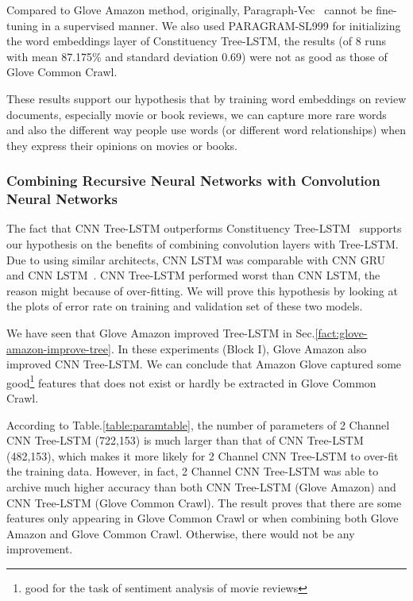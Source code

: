 Compared to Glove Amazon method, originally,  Paragraph-Vec~\cite{ParagraphVec} cannot be fine-tuning in a supervised manner.
We also used PARAGRAM-SL999 for initializing the word embeddings layer of Constituency Tree-LSTM,
the results (of 8 runs with mean 87.175\% and standard deviation 0.69) were not as good as those of Glove Common Crawl.

These results support our hypothesis that by training word embeddings on review documents, especially movie or book reviews, we can capture more rare words and also the different way people use words (or different word relationships) when they express their opinions on movies or books.

\subsubsection{Combining Recursive Neural Networks with Convolution Neural Networks}
\label{proved:tree-conv-benefit}
The fact that CNN Tree-LSTM outperforms Constituency Tree-LSTM~\cite{treeLSTM} supports our hypothesis on the benefits of combining convolution layers with Tree-LSTM.
Due to using similar architects, CNN LSTM was comparable with CNN GRU and CNN LSTM~\cite{cnn-rnn}. \label{unproved:cnn-treelstm-overfit}
CNN Tree-LSTM performed worst than CNN LSTM, the reason might because of over-fitting.
We will prove this hypothesis by looking at the plots of error rate on training and validation set of these two models.

\label{proved:Amazon-adv-Common}
We have seen that Glove Amazon improved Tree-LSTM in Sec.\ref{fact:glove-amazon-improve-tree}.
In these experiments (Block I), Glove Amazon also improved CNN Tree-LSTM.
We can conclude that Amazon Glove captured some good\footnote{good for the task of sentiment analysis of movie reviews} features that does not exist or hardly be extracted in Glove Common Crawl.

According to Table.\ref{table:paramtable}, the number of parameters of 2 Channel CNN Tree-LSTM (722,153) is much larger than that of CNN Tree-LSTM (482,153), which makes it more likely for 2 Channel CNN Tree-LSTM to over-fit the training data.
However, in fact, 2 Channel CNN Tree-LSTM was able to archive much higher accuracy than both CNN Tree-LSTM (Glove Amazon) and CNN Tree-LSTM (Glove Common Crawl).\label{proved:Common-syn-Amazon}
The result proves that there are some features only appearing in Glove Common Crawl or when combining both Glove Amazon and Glove Common Crawl.
Otherwise, there would not be any improvement.
